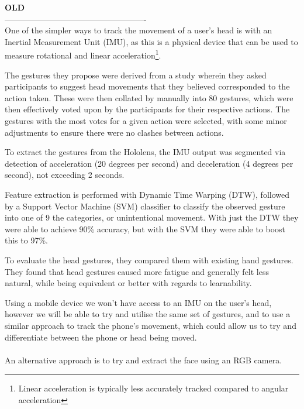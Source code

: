 \textbf{OLD}
\\
----------------------------------------------------
\\
One of the simpler ways to track the movement of a user's head is with an Inertial Measurement Unit
 (IMU), as this is a physical device that can be used to measure rotational and linear acceleration\footnote{Linear acceleration is typically less accurately tracked compared to angular acceleration}.



The gestures they propose were derived from a study wherein they asked participants to suggest head movements that they believed corresponded to the action taken.
These were then collated by manually into 80 gestures, which were then effectively voted upon by the participants for their respective actions.
The gestures with the most votes for a given action were selected, with some minor adjustments to ensure there were no clashes between actions.

To extract the gestures from the Hololens, the IMU output was segmented via detection of acceleration (20 degrees per second) and deceleration (4 degrees per second), not exceeding 2 seconds.

Feature extraction is performed with Dynamic Time Warping (DTW)\cite{berndt1994using}, followed by a Support Vector Machine (SVM) classifier to classify the observed gesture into one of 9 the categories, or unintentional movement. With just the DTW they were able to achieve 90\% accuracy, but with the SVM they were able to boost this to 97\%.

To evaluate the head gestures, they compared them with existing hand gestures. They found that head gestures caused more fatigue and generally felt less natural, while being equivalent or better with regards to learnability.

Using a mobile device we won't have access to an IMU on the user's head, however we will be able to try and utilise the same set of gestures, and to use a similar approach to track the phone's movement, which could allow us to try and differentiate between the phone or head being moved.
\\\\
An alternative approach is to try and extract the face using an RGB camera.

